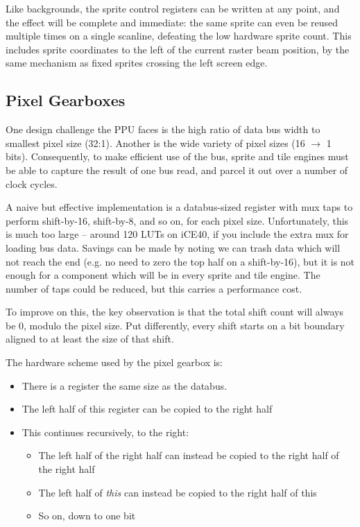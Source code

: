 Like backgrounds, the sprite control registers can be written at any point, and the effect will be complete and immediate: the same sprite can even be reused multiple times on a single scanline, defeating the low hardware sprite count. This includes sprite coordinates to the left of the current raster beam position, by the same mechanism as fixed sprites crossing the left screen edge.

\subsection{Pixel Gearboxes}

One design challenge the PPU faces is the high ratio of data bus width to smallest pixel size (32:1). Another is the wide variety of pixel sizes (16 $\to$ 1 bits). Consequently, to make efficient use of the bus, sprite and tile engines must be able to capture the result of one bus read, and parcel it out over a number of clock cycles.

A naive but effective implementation is a databus-sized register with mux taps to perform shift-by-16, shift-by-8, and so on, for each pixel size. Unfortunately, this is much too large -- around 120 LUTs on iCE40, if you include the extra mux for loading bus data. Savings can be made by noting we can trash data which will not reach the end (e.g. no need to zero the top half on a shift-by-16), but it is not enough for a component which will be in every sprite and tile engine. The number of taps could be reduced, but this carries a performance cost.

To improve on this, the key observation is that the total shift count will always be 0, modulo the pixel size. Put differently, every shift starts on a bit boundary aligned to at least the size of that shift.

The hardware scheme used by the pixel gearbox is:
\begin{itemize}
	\item There is a register the same size as the databus.
	\item The left half of this register can be copied to the right half
	\item This continues recursively, to the right:
	\begin{itemize}
		\item The left half of the right half can instead be copied to the right half of the right half
		\item The left half of {\it this} can instead be copied to the right half of this
		\item So on, down to one bit
	\end{itemize}
\end{itemize}

